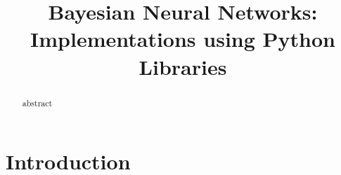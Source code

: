 \documentclass[conference]{IEEEtran}
\begin{document}


%
\title{Bayesian Neural Networks:\\[4pt] Implementations using Python Libraries}


\author{
	}





\maketitle

\begin{abstract}
	abstract

\end{abstract}





%
\IEEEpeerreviewmaketitle


\section{Introduction}
\label{sec:intro}
\end{document}
